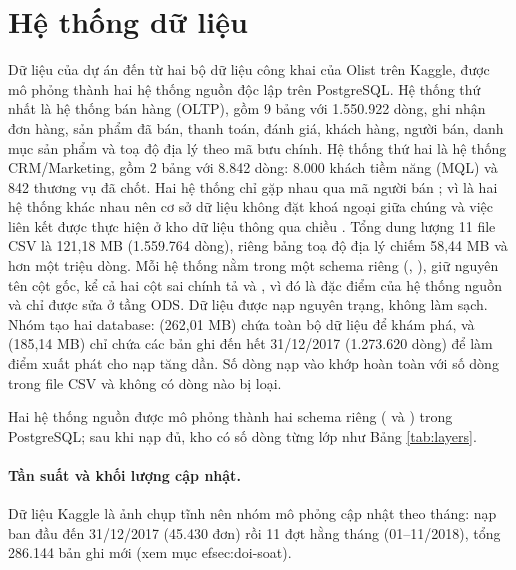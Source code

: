 \section{Hệ thống dữ liệu}\label{sec:du-lieu-nguon}
Dữ liệu của dự án đến từ hai bộ dữ liệu công khai của Olist trên Kaggle, được mô phỏng thành hai hệ thống nguồn độc lập trên PostgreSQL. Hệ thống thứ nhất là hệ thống bán hàng (OLTP), gồm 9 bảng với 1.550.922 dòng, ghi nhận đơn hàng, sản phẩm đã bán, thanh toán, đánh giá, khách hàng, người bán, danh mục sản phẩm và toạ độ địa lý theo mã bưu chính. Hệ thống thứ hai là hệ thống CRM/Marketing, gồm 2 bảng với 8.842 dòng: 8.000 khách tiềm năng (MQL) và 842 thương vụ đã chốt. Hai hệ thống chỉ gặp nhau qua mã người bán ; vì là hai hệ thống khác nhau nên cơ sở dữ liệu không đặt khoá ngoại giữa chúng và việc liên kết được thực hiện ở kho dữ liệu thông qua chiều . Tổng dung lượng 11 file CSV là 121,18 MB (1.559.764 dòng), riêng bảng toạ độ địa lý chiếm 58,44 MB và hơn một triệu dòng. Mỗi hệ thống nằm trong một schema riêng (, ), giữ nguyên tên cột gốc, kể cả hai cột sai chính tả  và , vì đó là đặc điểm của hệ thống nguồn và chỉ được sửa ở tầng ODS. Dữ liệu được nạp nguyên trạng, không làm sạch. Nhóm tạo hai database:  (262,01 MB) chứa toàn bộ dữ liệu để khám phá, và  (185,14 MB) chỉ chứa các bản ghi đến hết 31/12/2017 (1.273.620 dòng) để làm điểm xuất phát cho nạp tăng dần. Số dòng nạp vào  khớp hoàn toàn với số dòng trong file CSV và không có dòng nào bị loại.


Hai hệ thống nguồn được mô phỏng thành hai schema riêng ( và ) trong PostgreSQL; sau khi nạp đủ, kho có số dòng từng lớp như Bảng \ref{tab:layers}.

\paragraph{Tần suất và khối lượng cập nhật.} Dữ liệu Kaggle là ảnh chụp tĩnh nên nhóm mô phỏng cập nhật theo tháng: nạp ban đầu đến 31/12/2017 (45.430 đơn) rồi 11 đợt hằng tháng (01--11/2018), tổng 286.144 bản ghi mới (xem mục 
ef{sec:doi-soat}).

